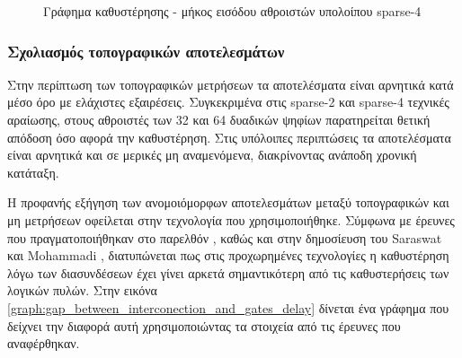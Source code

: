 \begin{figure}[H]


\begin{center}
\end{center}
\caption{Γράφημα καθυστέρησης - μήκος εισόδου αθροιστών υπολοίπου sparse-4}   
\label{graph:non-topo-sparse-4}
\end{figure}





\subsubsection{Σχολιασμός τοπογραφικών αποτελεσμάτων}
Στην περίπτωση των τοπογραφικών μετρήσεων τα αποτελέσματα είναι αρνητικά κατά μέσο όρο με ελάχιστες εξαιρέσεις. Συγκεκριμένα στις sparse-2 και sparse-4 τεχνικές αραίωσης, στους αθροιστές των 32 και 64 δυαδικών ψηφίων παρατηρείται θετική απόδοση όσο αφορά την καθυστέρηση. Στις υπόλοιπες περιπτώσεις τα αποτελέσματα είναι αρνητικά και σε μερικές μη αναμενόμενα, διακρίνοντας ανάποδη χρονική κατάταξη. 

Η προφανής εξήγηση των ανομοιόμορφων αποτελεσμάτων μεταξύ τοπογραφικών και μη μετρήσεων οφείλεται στην τεχνολογία που χρησιμοποιήθηκε. Σύμφωνα με έρευνες που πραγματοποιήθηκαν στο παρελθόν \cite{electronics6040078}, καθώς και στην δημοσίευση του Saraswat και Mohammadi \cite{1051729}, διατυπώνεται πως στις προχωρημένες τεχνολογίες η καθυστέρηση λόγω των διασυνδέσεων έχει γίνει αρκετά σημαντικότερη από τις καθυστερήσεις των λογικών πυλών. Στην εικόνα \ref{graph:gap_between_interconection_and_gates_delay} δίνεται ένα γράφημα που δείχνει την διαφορά αυτή χρησιμοποιώντας τα στοιχεία από τις έρευνες που αναφέρθηκαν.

